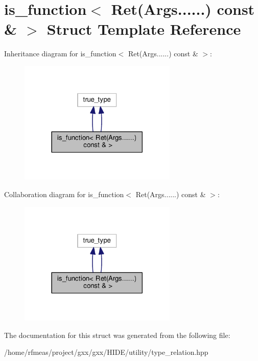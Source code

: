 \hypertarget{structis__function_3_01Ret_07Args_8_8_8_8_8_8_08_01const_01_6_01_4}{}\section{is\+\_\+function$<$ Ret(Args......) const \& $>$ Struct Template Reference}
\label{structis__function_3_01Ret_07Args_8_8_8_8_8_8_08_01const_01_6_01_4}


Inheritance diagram for is\+\_\+function$<$ Ret(Args......) const \& $>$\+:
\nopagebreak
\begin{figure}[H]
\begin{center}
\leavevmode
\includegraphics[width=213pt]{structis__function_3_01Ret_07Args_8_8_8_8_8_8_08_01const_01_6_01_4__inherit__graph}
\end{center}
\end{figure}


Collaboration diagram for is\+\_\+function$<$ Ret(Args......) const \& $>$\+:
\nopagebreak
\begin{figure}[H]
\begin{center}
\leavevmode
\includegraphics[width=213pt]{structis__function_3_01Ret_07Args_8_8_8_8_8_8_08_01const_01_6_01_4__coll__graph}
\end{center}
\end{figure}


The documentation for this struct was generated from the following file\+:\begin{DoxyCompactItemize}
\item 
/home/rfmeas/project/gxx/gxx/\+H\+I\+D\+E/utility/type\+\_\+relation.\+hpp\end{DoxyCompactItemize}
